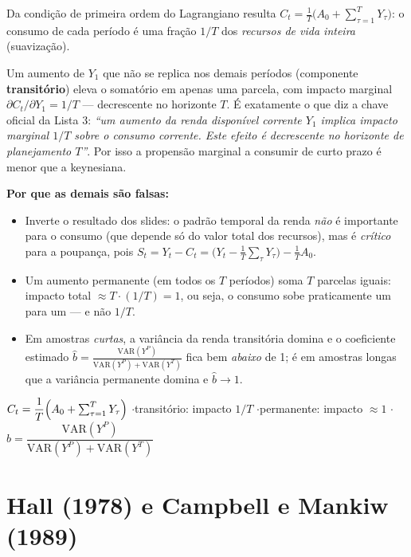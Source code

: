 \documentclass[12pt, a4paper]{article}
\newcommand{\VAR}{\mathrm{VAR}}
\begin{document}
\begin{correctbox}[title={Resposta correta: c)}]
Da condição de primeira ordem do Lagrangiano resulta
$C_t = \frac{1}{T}\bigl(A_0 + \sum_{\tau=1}^{T} Y_\tau\bigr)$: o consumo de
cada período é uma fração $1/T$ dos \emph{recursos de vida inteira}
(suavização).

Um aumento de $Y_1$ que não se replica nos demais períodos (componente
\textbf{transitório}) eleva o somatório em apenas uma parcela, com impacto
marginal $\partial C_t/\partial Y_1 = 1/T$ --- decrescente no horizonte $T$.
É exatamente o que diz a chave oficial da Lista 3: \emph{``um aumento da renda
disponível corrente $Y_1$ implica impacto marginal $1/T$ sobre o consumo
corrente. Este efeito é decrescente no horizonte de planejamento $T$''}. Por
isso a propensão marginal a consumir de curto prazo é menor que a keynesiana.
\checkmark

\textbf{Por que as demais são falsas:}
\begin{itemize}[leftmargin=*]
\item[a)] Inverte o resultado dos slides: o padrão temporal da renda
\emph{não} é importante para o consumo (que depende só do valor total dos
recursos), mas é \emph{crítico} para a poupança, pois
$S_t = Y_t - C_t = \bigl(Y_t - \frac{1}{T}\sum_\tau Y_\tau\bigr) - \frac{1}{T}A_0$.
\item[b)] Um aumento permanente (em todos os $T$ períodos) soma $T$ parcelas
iguais: impacto total $\approx T \cdot (1/T) = 1$, ou seja, o consumo sobe
praticamente um para um --- e não $1/T$.
\item[d)] Em amostras \emph{curtas}, a variância da renda transitória domina e
o coeficiente estimado
$\hat{b} = \frac{\VAR(Y^P)}{\VAR(Y^P) + \VAR(Y^T)}$
fica bem \emph{abaixo} de 1; é em amostras longas que a variância permanente
domina e $\hat{b} \to 1$.
\end{itemize}
\end{correctbox}

\begin{formulabox}[title={Para memorizar}]
$C_t = \dfrac{1}{T}\Bigl(A_0 + \sum_{\tau=1}^{T} Y_\tau\Bigr)$
\quad$\cdot$\quad transitório: impacto $1/T$
\quad$\cdot$\quad permanente: impacto $\approx 1$
\quad$\cdot$\quad $\hat{b} = \dfrac{\VAR(Y^P)}{\VAR(Y^P)+\VAR(Y^T)}$
\end{formulabox}

\section{Hall (1978) e Campbell e Mankiw (1989)}
\end{document}
